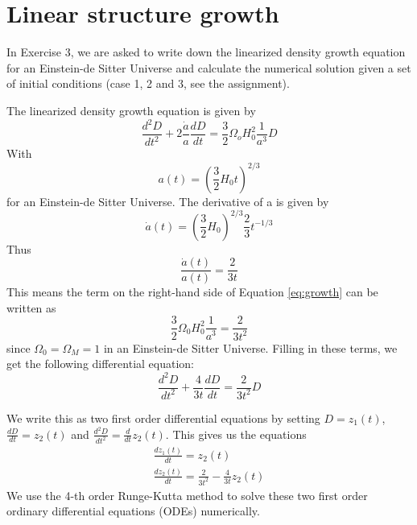 \section{Linear structure growth}
In Exercise 3, we are asked to write down the linearized density growth equation for an Einstein-de Sitter Universe and calculate the numerical solution given a set of initial conditions (case 1, 2 and 3, see the assignment).

The linearized density growth equation is given by
\begin{equation}\label{eq:growth}
\frac{d^2D}{dt^2} + 2\frac{\dot{a}}{a} \frac{dD}{dt} = \frac{3}{2} \Omega_o H_0^2 \frac{1}{a^3}D
\end{equation}
With 
\begin{equation}
a(t) = \left(\frac{3}{2}H_0t \right)^{2/3}
\end{equation}
for an Einstein-de Sitter Universe. 
The derivative of a is given by
\begin{equation}
\dot{a}(t) = \left(\frac{3}{2}H_0 \right)^{2/3} \frac{2}{3}t^{-1/3}
\end{equation}
Thus
\begin{equation}
\frac{\dot{a}(t)}{a(t)} = \frac{2}{3t}
\end{equation}
This means the term on the right-hand side of Equation \ref{eq:growth} can be written as
\begin{equation}
\frac{3}{2} \Omega_0 H_0^2 \frac{1}{a^3} = \frac{2}{3t^2}
\end{equation}
since $\Omega_0 = \Omega_M = 1$ in an Einstein-de Sitter Universe.
Filling in these terms, we get the following differential equation:
\begin{equation}\label{eq:ODE}
\frac{d^2D}{dt^2} + \frac{4}{3t} \frac{dD}{dt} = \frac{2}{3t^2} D
\end{equation}

We write this as two first order differential equations by setting $D=z_1(t)$, $\frac{dD}{dt} = z_2(t)$ and $\frac{d^2D}{dt^2} = \frac{d}{dt}z_2(t)$. This gives us the equations
\begin{equation}
\begin{split}
\frac{dz_1(t)}{dt} = z_2(t) \\
\frac{dz_2(t)}{dt} = \frac{2}{3t^2} - \frac{4}{3t} z_2(t)
\end{split}
\end{equation}
We use the 4-th order Runge-Kutta method to solve these two first order ordinary differential equations (ODEs) numerically. 



